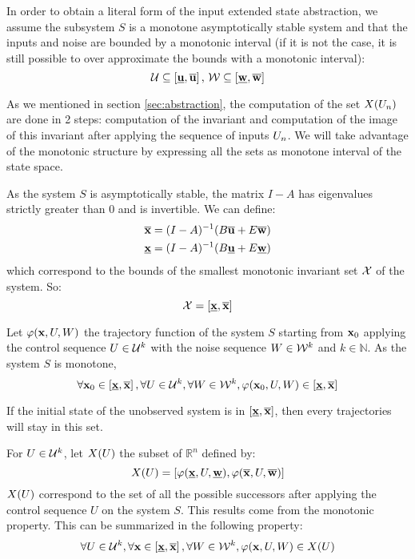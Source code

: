 In order to obtain a literal form of the input extended state abstraction, we assume the subsystem $S$ is a monotone asymptotically stable system and that the inputs and noise are bounded by a monotonic interval (if it is not the case, it is still possible to over approximate the bounds with a monotonic interval):
\begin{equation*}
\mathcal{U} \subseteq \left [ \underline{ \mathbf{u}}, \overline{ \mathbf{u}} \right ]
\textrm{, }
\mathcal{W} \subseteq \left [ \underline{ \mathbf{w}}, \overline{ \mathbf{w}} \right ]
\end{equation*}

As we mentioned in section \ref{sec:abstraction}, the computation of the set $X(U_n)$ are done in 2 steps: computation of the invariant and computation of the image of this invariant after applying the sequence of inputs $U_n$.
We will take advantage of the monotonic structure by expressing all the sets as monotone interval of the state space.

As the system $S$ is asymptotically stable, the matrix $I-A$ has eigenvalues strictly greater than $0$ and is invertible.
We can define:
\begin{equation}
\begin{split}
\overline{ \mathbf{x}} &= (I-A)^{-1} (B \overline{ \mathbf{u}} + E \overline{ \mathbf{w}})\\
\underline{ \mathbf{x}} &= (I-A)^{-1} (B \underline{ \mathbf{u}} + E \underline{ \mathbf{w}})\\
\end{split}
\end{equation}
which correspond to the bounds of the smallest monotonic invariant set $\mathcal{X}$ of the system.
So:
\begin{equation}
\mathcal{X} = \left[ \underline{ \mathbf{x}}, \overline{ \mathbf{x}} \right]
\end{equation}

Let $\varphi( \mathbf{x},U,W)$ the trajectory function of the system $S$ starting from $ \mathbf{x}_0$
applying the control sequence $U \in {\mathcal{U}}^k$
with the noise sequence $W \in {\mathcal{W}}^k$ and $k \in \mathbb{N}$.
As the system $S$ is monotone,
\begin{equation}
\forall  \mathbf{x}_0 \in \left [\underline{ \mathbf{x}}, \overline{ \mathbf{x}} \right ],
\forall U \in {\mathcal{U}}^k,
\forall W \in {\mathcal{W}}^k,
\varphi ( \mathbf{x}_0,U,W)
\in \left[ \underline{ \mathbf{x}}, \overline{ \mathbf{x}} \right]
\end{equation}

If the initial state of the unobserved system is in $\left[ \underline{ \mathbf{x}}, \overline{ \mathbf{x}} \right]$, then every trajectories will stay in this set.

For $U \in \mathcal{U}^k$, let $X(U)$ the subset of $\mathbb{R}^n$ defined by:
\begin{equation}
X(U) = \left[ 
\varphi (\underline{ \mathbf{x}},U,\underline{ \mathbf{w}}),
\varphi (\overline{ \mathbf{x}},U,\overline{ \mathbf{w}})
\right]
\end{equation}
$X(U)$ correspond to the set of all the possible successors after applying the control sequence $U$ on the system $S$. This results come from the monotonic property.
This can be summarized in the following property:
\begin{equation}
\forall U \in \mathcal{U}^k,
\forall  \mathbf{x} \in \left[\underline{ \mathbf{x}}, \overline{ \mathbf{x}} \right],
\forall W \in \mathcal{W}^k,
\varphi ( \mathbf{x},U,W) \in X(U)
\end{equation}

